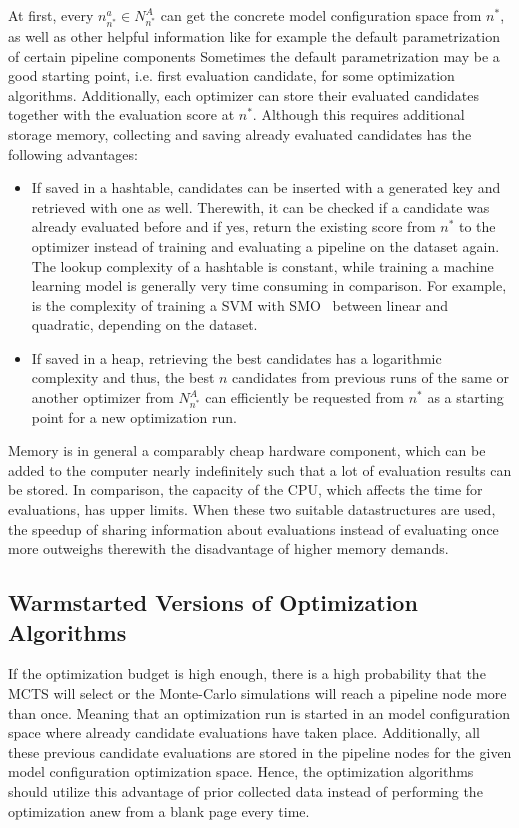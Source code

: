 At first, every $n^{a}_{n^*} \in N^A_{n^*}$ can get the concrete model configuration space from $n^*$, as well as other helpful information like for example the default parametrization of certain pipeline components
Sometimes the default parametrization may be a good starting point, i.e. first evaluation candidate, for some optimization algorithms.\newline
Additionally, each optimizer can store their evaluated candidates together with the evaluation score at $n^*$.
Although this requires additional storage memory, collecting and saving already evaluated candidates has the following advantages:
\begin{itemize}
    \item If saved in a hashtable, candidates can be inserted with a generated key and retrieved with one as well. Therewith, it can be checked if a candidate was already evaluated before and if yes, return the existing score from $n^*$ to the optimizer instead of training and evaluating a pipeline on the dataset again.
    The lookup complexity of a hashtable is constant, while training a machine learning model is generally very time consuming in comparison.
    For example, is the complexity of training a SVM with SMO~\cite{Platt-SMO} between linear and quadratic, depending on the dataset.
    \item If saved in a heap, retrieving the best candidates has a logarithmic complexity and thus, the best $n$ candidates from previous runs of the same or another optimizer from $N^A_{n^*}$ can efficiently be requested from $n^*$ as a starting point for a new optimization run.
\end{itemize}
Memory is in general a comparably cheap hardware component, which can be added to the computer nearly indefinitely such that a lot of evaluation results can be stored.
In comparison, the capacity of the CPU, which affects the time for evaluations, has upper limits.
When these two suitable datastructures are used, the speedup of sharing information about evaluations instead of evaluating once more outweighs therewith the disadvantage of higher memory demands.

\subsection{Warmstarted Versions of Optimization Algorithms}
\label{sec:approach:configuration:warmstart}
If the optimization budget is high enough, there is a high probability that the MCTS will select or the Monte-Carlo simulations will reach a pipeline node more than once.
Meaning that an optimization run is started in an model configuration space where already candidate evaluations have taken place.
Additionally, all these previous candidate evaluations are stored in the pipeline nodes for the given model configuration optimization space.
Hence, the optimization algorithms should utilize this advantage of prior collected data instead of performing the optimization anew from a blank page every time.

